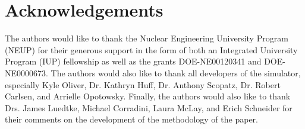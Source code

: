 \documentclass[review]{elsarticle}
\begin{document}
 

\newpage





%

\section*{Acknowledgements}

The authors would like to thank the Nuclear Engineering University Program
(NEUP) for their generous support in the form of both an Integrated University
Program (IUP) fellowship as well as the grants DOE-NE00120341 and
DOE-NE0000673. The authors would also like to thank all developers of the
\Cyclus simulator, especially Kyle Oliver, Dr. Kathryn Huff, Dr. Anthony
Scopatz, Dr. Robert Carlsen, and Arrielle Opotowsky. Finally, the authors would
also like to thank Drs. James Luedtke, Michael Corradini, Laura McLay, and Erich
Schneider for their comments on the development of the methodology of the paper.

\newpage
\section*{\refname}

\end{document}
